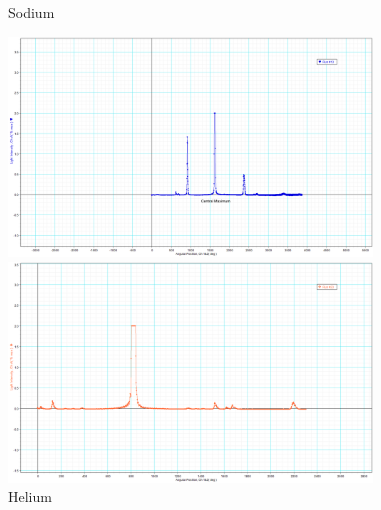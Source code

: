 \documentclass[11.8pt]{amsart}
\begin{document}
\begin{figure}[H]
    \begin{minipage}{.5\textwidth}
        \caption{Sodium}
        \includegraphics[height=2.3in]{sod.png}
    \end{minipage}%
    \begin{minipage}{.5\textwidth}
        \caption{Helium}
        \includegraphics[height=2.3in]{he.png}
    \end{minipage}
\end{figure}
\vfill
\end{document}
